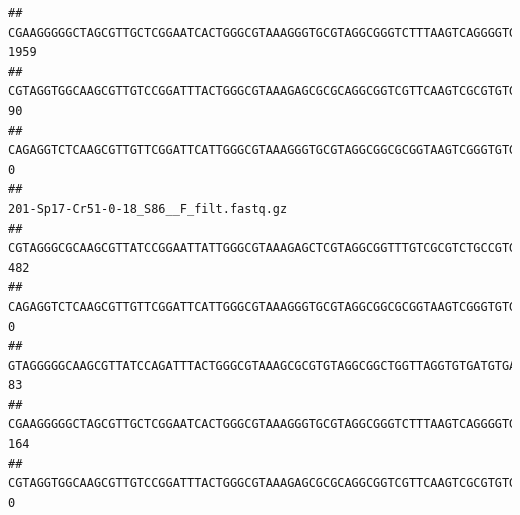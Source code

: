 \documentclass[]{article}
\begin{document}
\begin{verbatim}
## CGAAGGGGGCTAGCGTTGCTCGGAATCACTGGGCGTAAAGGGTGCGTAGGCGGGTCTTTAAGTCAGGGGTGAAATCCTGGAGCTCAACTCCAGAACTGCCTTTGATACTGAAGATCTTGAGTTCGGGAGAGGTGAGTGGAACTGCGAGTGTAGAGGTGAAATTCGTAGATATTCGCAAGAACACCAGTGGCGAAGGCGGCTCACTGGCCCGATACTGACGCTGAGGCACGAAAGCGTGGGGAGCAAACA                                    1959
## CGTAGGTGGCAAGCGTTGTCCGGATTTACTGGGCGTAAAGAGCGCGCAGGCGGTCGTTCAAGTCGCGTGTGAAAGCCCCCGGCTCAACTGGGGAGGGTCACGCGATACTGATCGACTCGAAGGCAGGAGAGGGTAGTGGAATTCCCGGTGTAGTGGTGAAATGCGTAGATATCGGGAGGAACACCAGTGGCGAAGGCGACTACCTGGCCTGTTCTTGACGCTGAGGCGCGAAAGCTAGGGGAGCAAACG                                      90
## CAGAGGTCTCAAGCGTTGTTCGGATTCATTGGGCGTAAAGGGTGCGTAGGCGGCGCGGTAAGTCGGGTGTGAAATCTCGGGGCTTAACTCCGAAACTGCATTCGATACTGCCGTGCTTGAGGACTGGAGAGGAGACTGGAATTTACGGTGTAGCGGTGAAATGCGTAGATATCGTAAGGAAGACCAGTGGCGAAGGCGGGTCTCTGGACAGTTCCTGACGCTGAGGCACGAAGGCCAGGGGAGCAAACG                                       0
##                                                                                                                                                                                                                                                           201-Sp17-Cr51-0-18_S86__F_filt.fastq.gz
## CGTAGGGCGCAAGCGTTATCCGGAATTATTGGGCGTAAAGAGCTCGTAGGCGGTTTGTCGCGTCTGCCGTGAAAGTCCGGGGCTCAACTCCGGATCTGCGGTGGGTACGGGCAGACTAGAGTGATGTAGGGGAGACTGGAATTCCTGGTGTAGCGGTGAAATGCGCAGATATCAGGAGGAACACCGATGGCGAAGGCAGGTCTCTGGGCATTAACTGACGCTGAGGAGCGAAAGCATGGGGAGCGAACA                                     482
## CAGAGGTCTCAAGCGTTGTTCGGATTCATTGGGCGTAAAGGGTGCGTAGGCGGCGCGGTAAGTCGGGTGTGAAATCTCGGAGCTTAACTCCGAAACTGCATTCGATACTGCCGTGCTTGAGGACTGGAGAGGAGACTGGAATTTACGGTGTAGCGGTGAAATGCGTAGATATCGTAAGGAAGACCAGTGGCGAAGGCGGGTCTCTGGACAGTTCCTGACGCTGAGGCACGAAGGCCAGGGGAGCAAACG                                       0
## GTAGGGGGCAAGCGTTATCCAGATTTACTGGGCGTAAAGCGCGTGTAGGCGGCTGGTTAGGTGTGATGTGAAATCTTCCGGCTCAACCGGAAAACTGCATTGCAAACCGGCCTGGCTAGAGTGCAGGAGAGGGAAGCGGAATTCCAGGTGTAGCGGTGAAATGCGTAGATATCTGGAGGAACACCAGTGGCGAAGGCGGCTTCCTGGCCTGCAACTGACGCTGAGACGCGAAAGCGTGGGGAGCGAAC                                       83
## CGAAGGGGGCTAGCGTTGCTCGGAATCACTGGGCGTAAAGGGTGCGTAGGCGGGTCTTTAAGTCAGGGGTGAAATCCTGGAGCTCAACTCCAGAACTGCCTTTGATACTGAAGATCTTGAGTTCGGGAGAGGTGAGTGGAACTGCGAGTGTAGAGGTGAAATTCGTAGATATTCGCAAGAACACCAGTGGCGAAGGCGGCTCACTGGCCCGATACTGACGCTGAGGCACGAAAGCGTGGGGAGCAAACA                                     164
## CGTAGGTGGCAAGCGTTGTCCGGATTTACTGGGCGTAAAGAGCGCGCAGGCGGTCGTTCAAGTCGCGTGTGAAAGCCCCCGGCTCAACTGGGGAGGGTCACGCGATACTGATCGACTCGAAGGCAGGAGAGGGTAGTGGAATTCCCGGTGTAGTGGTGAAATGCGTAGATATCGGGAGGAACACCAGTGGCGAAGGCGACTACCTGGCCTGTTCTTGACGCTGAGGCGCGAAAGCTAGGGGAGCAAACG                                       0

\end{verbatim}
\end{document}
